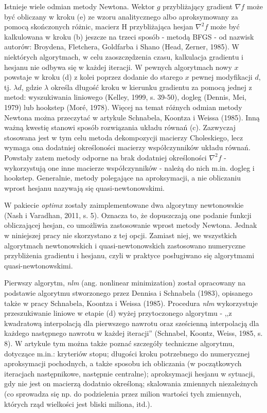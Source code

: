 Istnieje wiele odmian metody Newtona. Wektor $g$ przybliżający gradient $\nabla f$ może być obliczany w kroku (e) ze wzoru analitycznego albo aproksymowany za pomocą skończonych różnic, macierz H przybliżająca hesjan $\nabla^{2} f$ może być kalkulowana w kroku (b) jeszcze na trzeci sposób - metodą BFGS - od nazwisk autorów: Broydena, Fletchera, Goldfarba i Shano (Head, Zerner, 1985)\nocite{BFGS_1985}. W niektórych algorytmach, w celu zaoszczędzenia czasu, kalkulacja gradientu i hesjanu nie odbywa się w każdej iteracji. W pewnych algorytmach nowy $x$ powstaje w kroku (d) z kolei poprzez dodanie do starego $x$ pewnej modyfikacji $d$, tj. $\lambda d$, gdzie $\lambda$ określa długość kroku w kierunku gradientu za pomocą jednej z metod: wyszukiwania liniowego (Kelley, 1999, s. 39-50), dogleg (Dennis, Mei, 1979)\nocite{Dennis_Mei_1979} lub hookstep (Mor\'{e}, 1978)\nocite{More_1978}. Więcej na temat różnych odmian metody Newtona można przeczytać w artykule Schnabela, Koontza i Weissa (1985)\nocite{Schnabel_Koontz_Weiss_1985}. Inną ważną kwestię stanowi sposób rozwiązania układu równań (c). Zazwyczaj stosowana jest w tym celu metoda dekompozycji macierzy Choleskiego, lecz wymaga ona dodatniej określoności macierzy współczynników układu równań. Powstały zatem metody odporne na brak dodatniej określoności $\nabla^{2}f$ - wykorzystują one inne macierze współczynników - należą do nich m.in. dogleg i hookstep. Generalnie, metody polegające na aproksymacji, a nie obliczaniu wprost hesjanu nazywają się quasi-newtonowskimi.       

W pakiecie \textit{optimx} zostały zaimplementowane dwa algorytmy newtonowskie (Nash i Varadhan, 2011, s. 5). Oznacza to, że dopuszczają one podanie funkcji obliczającej hesjan, co umożliwia zastosowanie wprost metody Newtona. Jednak w niniejszej pracy nie skorzystano z tej opcji. Zamiast niej, we wszystkich algorytmach newtonowskich i quasi-newtonowskich zastosowano numeryczne przybliżenia gradientu i hesjanu, czyli w praktyce posługiwano się algorytmami quasi-newtonowskimi.

Pierwszy algorytm, \textit{nlm} (ang. nonlinear minimization) został opracowany na podstawie algorytmu stworzonego przez Dennisa i Schnabela (1983)\nocite{Dennis_Schnabel_1983}, opisanego także w pracy Schnabela, Koontza i Weissa (1985). Procedura \textit{nlm} wykorzystuje przeszukiwanie liniowe w etapie (d) wyżej przytoczonego algorytmu - ,,z kwadratową interpolacją dla pierwszego nawrotu oraz sześcienną interpolacją dla każdego następnego nawrotu w każdej iteracji'' (Schnabel, Koontz, Weiss, 1985, s. 8). W artykule tym można także poznać szczegóły techniczne algorytmu, dotyczące m.in.: kryteriów stopu; długości kroku potrzebnego do numerycznej aproksymacji pochodnych, a także sposobu ich obliczania (w początkowych iteracjach następnikowe, następnie centralne); aproksymacji hesjanu w sytuacji, gdy nie jest on macierzą dodatnio określoną; skalowania zmiennych niezależnych (co sprowadza się np. do podzielenia przez milion wartości tych zmiennych, których rząd wielkości jest bliski miliona, itd.).  

